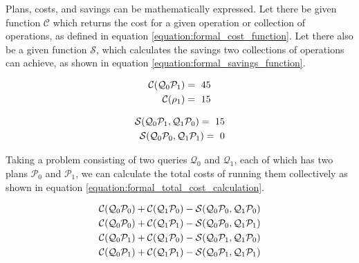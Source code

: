Plans, costs, and savings can be mathematically expressed. Let there be given function $\mathcal{C}$ which returns the cost for a given operation or collection of operations, as defined in equation \ref{equation:formal_cost_function}. Let there also be a given function $\mathcal{S}$, which calculates the savings two collections of operations can achieve, as shown in equation \ref{equation:formal_savings_function}.

\begin{equation}
    \centering
    \begin{split}
        \mathcal{C}(\mathcal{Q}_0\mathcal{P}_1) =\ 45 \\
        \mathcal{C}(\rho_1) =\ 15 \\
    \end{split}
    \label{equation:formal_cost_function}
\end{equation}

\begin{equation}
    \centering
    \begin{split}
        \mathcal{S}(\mathcal{Q}_0\mathcal{P}_1, \mathcal{Q}_1\mathcal{P}_0) =\ 15 \\
        \mathcal{S}(\mathcal{Q}_0\mathcal{P}_0, \mathcal{Q}_1\mathcal{P}_1) =\ 0 \\
    \end{split}
    \label{equation:formal_savings_function}
\end{equation}


Taking a problem consisting of two queries $\mathcal{Q}_0$ and $\mathcal{Q}_1$, each of which has two plans $\mathcal{P}_0$ and $\mathcal{P}_1$, we can calculate the total costs of running them collectively as shown in equation \ref{equation:formal_total_cost_calculation}.

\begin{equation}
    \centering
    \begin{split}
        \mathcal{C}(\mathcal{Q}_0\mathcal{P}_0) + \mathcal{C}(\mathcal{Q}_1\mathcal{P}_0) - \mathcal{S}(\mathcal{Q}_0\mathcal{P}_0, \mathcal{Q}_1\mathcal{P}_0) \\
        \mathcal{C}(\mathcal{Q}_0\mathcal{P}_0) + \mathcal{C}(\mathcal{Q}_1\mathcal{P}_1) - \mathcal{S}(\mathcal{Q}_0\mathcal{P}_0, \mathcal{Q}_1\mathcal{P}_1) \\
        \mathcal{C}(\mathcal{Q}_0\mathcal{P}_1) + \mathcal{C}(\mathcal{Q}_1\mathcal{P}_0) - \mathcal{S}(\mathcal{Q}_0\mathcal{P}_1, \mathcal{Q}_1\mathcal{P}_0) \\
        \mathcal{C}(\mathcal{Q}_0\mathcal{P}_1) + \mathcal{C}(\mathcal{Q}_1\mathcal{P}_1) - \mathcal{S}(\mathcal{Q}_0\mathcal{P}_1, \mathcal{Q}_1\mathcal{P}_1) \\
    \end{split}
    \label{equation:formal_total_cost_calculation}
\end{equation}

